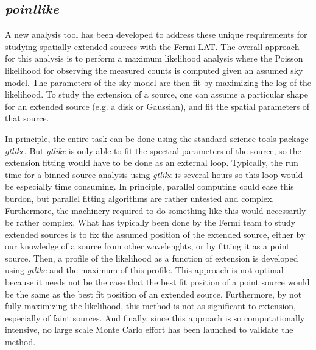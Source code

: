 \documentclass[preprint]{aastex}
\newcommand{\pointlike}{{\em pointlike}\xspace}
\newcommand{\gtlike}{{\em gtlike}\xspace}
\begin{document}
\subsection{\pointlike}

A new analysis tool has been developed to address these unique
requirements for studying spatially extended sources with the Fermi
LAT. The overall approach for this analysis is to perform a maximum
likelihood analysis where the Poisson likelihood for observing the
measured counts is computed given an assumed sky model. The parameters
of the sky model are then fit by maximizing the log of the likelihood.
To study the extension of a source, one can assume a particular shape
for an extended source (e.g. a disk or Gaussian), and fit the spatial
parameters of that source.

In principle, the entire task can be done using the standard science
tools package \gtlike\cite{Science-Tools-gtlike}. But \gtlike is
only able to fit the spectral parameters of the source, so the extension
fitting would have to be done as an external loop. Typically, the run time
for a binned source analysis using \gtlike is several hours so this loop
would be especially time consuming. In principle, parallel computing could
ease this burdon, but parallel fitting algorithms are rather untested
and complex. Furthermore, the machinery required to do something like
this would necessarily be rather complex. What has typically been done by
the Fermi team to study extended sources is to fix the assumed position
of the extended source, either by our knowledge of a source from other
wavelenghts, or by fitting it as a point source. Then, a profile of the
likelihood as a function of extension is developed using \gtlike
and the maximum of this profile. This approach is not optimal because it
needs not be the case that the best fit position of a point source would
be the same as the best fit position of an extended source. Furthermore,
by not fully maximizing the likelihood, this method is not as significant to
extension, especially of faint sources. And finally, since this approach
is so computationally intensive, no large scale Monte Carlo effort has been
launched to validate the method.
\end{document}
